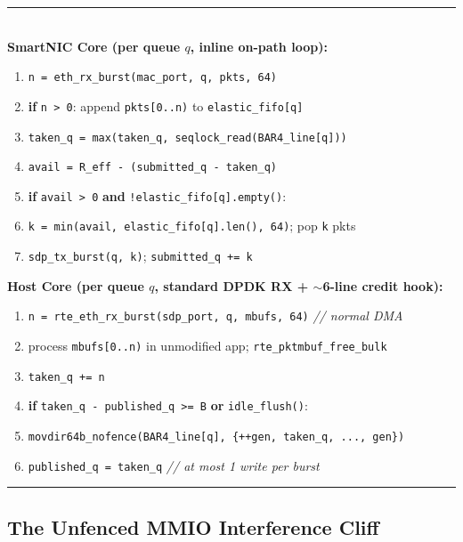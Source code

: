 \begin{algorithm}[t]
\footnotesize
\noindent\rule{\linewidth}{0.6pt}\\[2pt]
\textbf{SmartNIC Core (per queue $q$, inline on-path loop):}
\begin{enumerate}[leftmargin=1.4em, itemsep=0.5pt, topsep=2pt]
  \item \texttt{n = eth\_rx\_burst(mac\_port, q, pkts, 64)}
  \item \textbf{if} \texttt{n > 0}: append \texttt{pkts[0..n)} to \texttt{elastic\_fifo[q]}
  \item \texttt{taken\_q = max(taken\_q, seqlock\_read(BAR4\_line[q]))}
  \item \texttt{avail = R\_eff - (submitted\_q - taken\_q)}
  \item \textbf{if} \texttt{avail > 0} \textbf{and} \texttt{!elastic\_fifo[q].empty()}:
  \item \quad \texttt{k = min(avail, elastic\_fifo[q].len(), 64)}; pop \texttt{k} pkts
  \item \quad \texttt{sdp\_tx\_burst(q, k)}; \texttt{submitted\_q += k}
\end{enumerate}
\vspace{3pt}
\textbf{Host Core (per queue $q$, standard DPDK RX + $\sim$6-line credit hook):}
\begin{enumerate}[leftmargin=1.4em, itemsep=0.5pt, topsep=2pt]
  \item \texttt{n = rte\_eth\_rx\_burst(sdp\_port, q, mbufs, 64)} \hfill\textit{// normal DMA}
  \item process \texttt{mbufs[0..n)} in unmodified app; \texttt{rte\_pktmbuf\_free\_bulk}
  \item \texttt{taken\_q += n}
  \item \textbf{if} \texttt{taken\_q - published\_q >= B} \textbf{or} \texttt{idle\_flush()}:
  \item \quad \texttt{movdir64b\_nofence(BAR4\_line[q], \{++gen, taken\_q, ..., gen\})}
  \item \quad \texttt{published\_q = taken\_q} \hfill\textit{// at most 1 write per burst}
\end{enumerate}
\vspace{-2pt}
\noindent\rule{\linewidth}{0.6pt}
\caption{Unified single-path credit gating on the SmartNIC and unfenced credit
return on the host.}
\label{alg:creditring}
\end{algorithm}

\subsection{The Unfenced MMIO Interference Cliff}
\label{sec:design-cliff}

